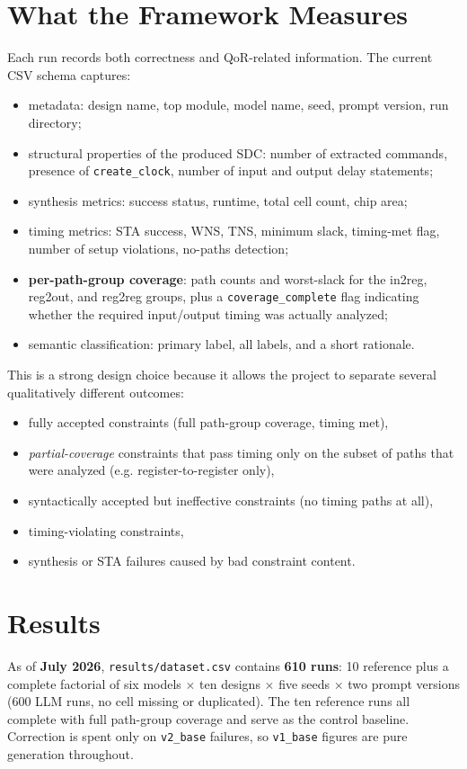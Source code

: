 \documentclass[11pt]{article}
\begin{document}
\section*{What the Framework Measures}
Each run records both correctness and QoR-related information. The current CSV schema captures:
\begin{itemize}[leftmargin=*,nosep]
    \item metadata: design name, top module, model name, seed, prompt version, run directory;
    \item structural properties of the produced SDC: number of extracted commands, presence of \texttt{create\_clock}, number of input and output delay statements;
    \item synthesis metrics: success status, runtime, total cell count, chip area;
    \item timing metrics: STA success, WNS, TNS, minimum slack, timing-met flag, number of setup violations, no-paths detection;
    \item \textbf{per-path-group coverage}: path counts and worst-slack for the in2reg, reg2out, and reg2reg groups, plus a \texttt{coverage\_complete} flag indicating whether the required input/output timing was actually analyzed;
    \item semantic classification: primary label, all labels, and a short rationale.
\end{itemize}

This is a strong design choice because it allows the project to separate several qualitatively different outcomes:
\begin{itemize}[leftmargin=*,nosep]
    \item fully accepted constraints (full path-group coverage, timing met),
    \item \emph{partial-coverage} constraints that pass timing only on the subset of paths that were analyzed (e.g. register-to-register only),
    \item syntactically accepted but ineffective constraints (no timing paths at all),
    \item timing-violating constraints,
    \item synthesis or STA failures caused by bad constraint content.
\end{itemize}

\section*{Results}
As of \textbf{July 2026}, \texttt{results/dataset.csv} contains \textbf{610 runs}: 10 reference plus a complete factorial of six models $\times$ ten designs $\times$ five seeds $\times$ two prompt versions (600 LLM runs, no cell missing or duplicated). The ten reference runs all complete with full path-group coverage and serve as the control baseline. Correction is spent only on \texttt{v2\_base} failures, so \texttt{v1\_base} figures are pure generation throughout.
\end{document}
